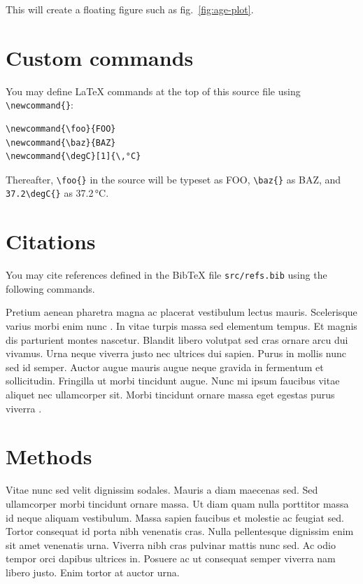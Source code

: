 This will create a floating figure such as fig.~\ref{fig:age-plot}.

\hypertarget{custom-commands}{%
\section{Custom commands}\label{custom-commands}}

You may define \LaTeX{} commands at the top of this source file using
\texttt{\textbackslash{}newcommand\{\}}:

\begin{verbatim}
\newcommand{\foo}{FOO}
\newcommand{\baz}{BAZ}
\newcommand{\degC}[1]{\,°C}
\end{verbatim}

Thereafter, \texttt{\textbackslash{}foo\{\}} in the source will be
typeset as FOO{}, \texttt{\textbackslash{}baz\{\}} as BAZ{}, and
\texttt{37.2\textbackslash{}degC\{\}} as 37.2\,°C.

\hypertarget{citations}{%
\section{Citations}\label{citations}}

You may cite references defined in the Bib\TeX{} file
\texttt{src/refs.bib} using the following commands.

Pretium aenean pharetra magna ac placerat vestibulum lectus mauris.
Scelerisque varius morbi enim nunc \cite{Coplen-2007}. In vitae turpis
massa sed elementum tempus. Et magnis dis parturient montes nascetur.
Blandit libero volutpat sed cras ornare arcu dui vivamus. Urna neque
viverra justo nec ultrices dui sapien. Purus in mollis nunc sed id
semper. Auctor augue mauris augue neque gravida in fermentum et
sollicitudin. Fringilla ut morbi tincidunt augue. Nunc mi ipsum faucibus
vitae aliquet nec ullamcorper sit. Morbi tincidunt ornare massa eget
egestas purus viverra .

\hypertarget{methods}{%
\section{Methods}\label{methods}}

\label{sec:methods}

Vitae nunc sed velit dignissim sodales. Mauris a diam maecenas sed. Sed
ullamcorper morbi tincidunt ornare massa. Ut diam quam nulla porttitor
massa id neque aliquam vestibulum. Massa sapien faucibus et molestie ac
feugiat sed. Tortor consequat id porta nibh venenatis cras. Nulla
pellentesque dignissim enim sit amet venenatis urna. Viverra nibh cras
pulvinar mattis nunc sed. Ac odio tempor orci dapibus ultrices in.
Posuere ac ut consequat semper viverra nam libero justo. Enim tortor at
auctor urna.

